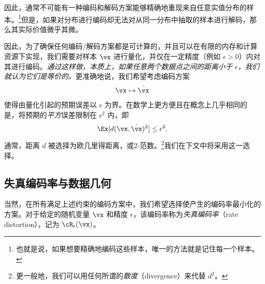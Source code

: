 \documentclass[../../book-main_zh.tex]{subfiles}
\begin{document}
因此，通常不可能有一种编码和解码方案能够精确地重现来自任意实值分布的样本。\footnote{也就是说，如果想要精确地编码这些样本，唯一的方法就是记住每一个样本。}但是，如果对分布进行编码却无法对从同一分布中抽取的样本进行解码，那么其实际价值微乎其微。

因此，为了确保任何编码/解码方案都是可计算的，并且可以在有限的内存和计算资源下实现，我们需要对样本 $\vx$ 进行量化，并仅在一定精度（例如 $\epsilon > 0$）内对其进行编码。{\em 通过这样做，本质上，如果任意两个数据点之间的距离小于 $\epsilon$，我们就认为它们是等价的。}更准确地说，我们希望考虑编码方案
\begin{equation}
    \vx \mapsto \hat \vx
\end{equation}
使得由量化引起的预期误差以 $\epsilon$ 为界。在数学上更方便且在概念上几乎相同的是，将预期的\textit{平方}误差限制在 \(\epsilon^{2}\) 内，即
\begin{equation}
    \Ex[d(\vx, \hat \vx)^{2}] \le \epsilon^{2}.
\end{equation}
通常，距离 \(d\) 被选择为欧几里得距离，或2-范数。\footnote{更一般地，我们可以用任何所谓的\textit{散度}（divergence）来代替 \(d^{2}\)。}我们在下文中将采用这一选择。

\subsection{失真编码率与数据几何}
当然，在所有满足上述约束的编码方案中，我们希望选择使产生的编码率最小化的方案。对于给定的随机变量 $\vx$ 和精度 $\epsilon$，该编码率称为\textit{失真编码率}（rate distortion），记为 $\cR_{\epsilon}(\vx)$。
\end{document}
